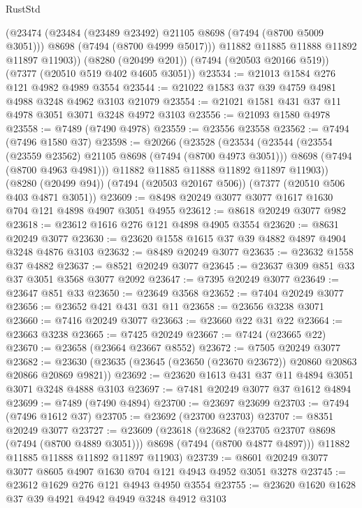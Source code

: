 \begin{lexlean}{RustStd}
\begin{coremodule}
        (@23474
          (@23484 (@23489 @23492) @21105 @8698 (@7494 (@8700 @5009 @3051)))
          @8698
          (@7494 (@8700 @4999 @5017)))
        @11882
        @11885
        @11888
        @11892
        @11897
        @11903))
    (@8280 (@20499 @201))
    (@7494 (@20503 @20166 @519))
    (@7377 (@20510 @519 @402 @4605 @3051))
@23534 := @21013 @1584 @276 @121 @4982 @4989 @3554
@23544 := @21022 @1583 @37 @39 @4759 @4981 @4988 @3248 @4962 @3103 @21079
@23554 := @21021 @1581 @431 @37 @11 @4978 @3051 @3071 @3248 @4972 @3103
@23556 := @21093 @1580 @4978
@23558 := @7489 (@7490 @4978)
@23559 := @23556 @23558
@23562 := @7494 (@7496 @1580 @37)
@23598 := @20266
    (@23528
      (@23534
        (@23544
          (@23554 (@23559 @23562) @21105 @8698 (@7494 (@8700 @4973 @3051)))
          @8698
          (@7494 (@8700 @4963 @4981)))
        @11882
        @11885
        @11888
        @11892
        @11897
        @11903))
    (@8280 (@20499 @94))
    (@7494 (@20503 @20167 @506))
    (@7377 (@20510 @506 @403 @4871 @3051))
@23609 := @8498 @20249 @3077 @3077 @1617 @1630 @704 @121 @4898 @4907 @3051 @4955
@23612 := @8618 @20249 @3077 @982
@23618 := @23612 @1616 @276 @121 @4898 @4905 @3554
@23620 := @8631 @20249 @3077
@23630 := @23620 @1558 @1615 @37 @39 @4882 @4897 @4904 @3248 @4876 @3103
@23632 := @8489 @20249 @3077
@23635 := @23632 @1558 @37 @4882
@23637 := @8521 @20249 @3077
@23645 := @23637 @309 @851 @33 @37 @3051 @3568 @3077 @2092
@23647 := @7395 @20249 @3077
@23649 := @23647 @851 @33
@23650 := @23649 @3568
@23652 := @7404 @20249 @3077
@23656 := @23652 @421 @431 @31 @11
@23658 := @23656 @3238 @3071
@23660 := @7416 @20249 @3077
@23663 := @23660 @22 @31 @22
@23664 := @23663 @3238
@23665 := @7425 @20249
@23667 := @7424 (@23665 @22)
@23670 := @23658 (@23664 @23667 @8552)
@23672 := @7505 @20249 @3077
@23682 := @23630 (@23635 (@23645 (@23650 (@23670 @23672)) @20860 @20863 @20866 @20869 @9821))
@23692 := @23620 @1613 @431 @37 @11 @4894 @3051 @3071 @3248 @4888 @3103
@23697 := @7481 @20249 @3077 @37 @1612 @4894
@23699 := @7489 (@7490 @4894)
@23700 := @23697 @23699
@23703 := @7494 (@7496 @1612 @37)
@23705 := @23692 (@23700 @23703)
@23707 := @8351 @20249 @3077
@23727 := @23609
    (@23618
      (@23682 (@23705 @23707 @8698 (@7494 (@8700 @4889 @3051))) @8698 (@7494 (@8700 @4877 @4897)))
      @11882
      @11885
      @11888
      @11892
      @11897
      @11903)
@23739 := @8601 @20249 @3077 @3077 @8605 @4907 @1630 @704 @121 @4943 @4952 @3051 @3278
@23745 := @23612 @1629 @276 @121 @4943 @4950 @3554
@23755 := @23620 @1620 @1628 @37 @39 @4921 @4942 @4949 @3248 @4912 @3103

\end{coremodule}
\end{lexlean}
